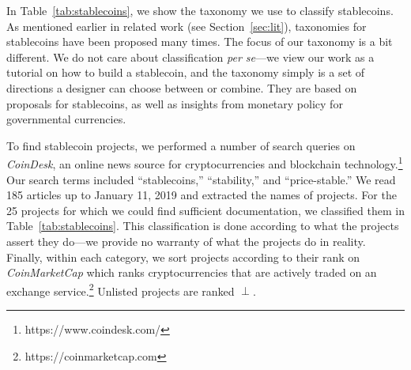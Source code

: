 

In Table~\ref{tab:stablecoins}, we show the taxonomy we use to classify stablecoins. As mentioned earlier in related work (see Section~\ref{sec:lit}), taxonomies for stablecoins have been proposed many times. The focus of our taxonomy is a bit different. We do not care about classification \textit{per se}---we view our work as a tutorial on how to build a stablecoin, and the taxonomy simply is a set of directions a designer can choose between or combine. They are based on proposals for stablecoins, as well as insights from monetary policy for governmental currencies.

To find stablecoin projects, we performed a number of search queries on \textit{CoinDesk}, an online news source for cryptocurrencies and blockchain technology.\footnote{https://www.coindesk.com/} Our search terms included ``stablecoins,'' ``stability,'' and ``price-stable.'' We read 185 articles up to January 11, 2019 and extracted the names of projects. For the 25 projects for which we could find sufficient documentation, we classified them in Table~\ref{tab:stablecoins}. This classification is done according to what the projects assert they do---we provide no warranty of what the projects do in reality. Finally, within each category, we sort projects according to their rank on \textit{CoinMarketCap} which ranks cryptocurrencies that are actively traded on an exchange service.\footnote{https://coinmarketcap.com} Unlisted projects are ranked $\perp$.


